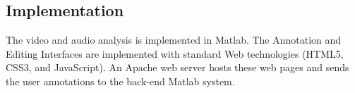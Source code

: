 \subsection{Implementation}
The video and audio analysis is implemented in Matlab. The Annotation and Editing Interfaces are implemented with standard Web technologies (HTML5, CSS3, and JavaScript). An Apache web server hosts these web pages and sends the user annotations to the back-end Matlab system.

